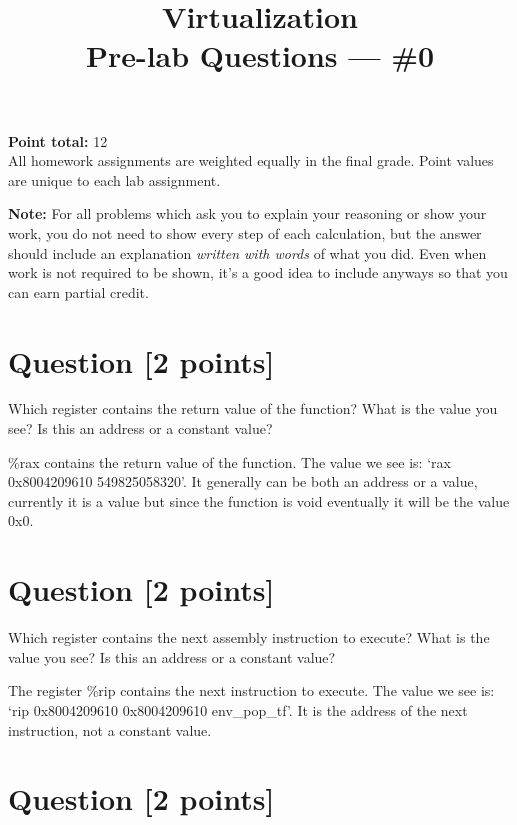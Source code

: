 \documentclass[11pt]{article}
\providecommand{\due}{}
\begin{document}
\title{Virtualization\\Pre-lab Questions --- \#0}
\date{\due}

\maketitle

\noindent \textbf{Point total:} 12
\\ All homework assignments are weighted equally in the final grade. 
Point values are unique to each lab assignment.

\textbf{Note:} For all problems which ask you to explain your reasoning or show your work, 
you do not need to show every step of each calculation, 
but the answer should include an explanation \emph{written with words} of what you did.  
Even when work is not required to be shown, it’s a good idea to include anyways so that 
you can earn partial credit.

\section{Question [2 points]}

Which register contains the return value of the function? 
What is the value you see? Is this an address or a constant value?

\begin{solution}
\%rax contains the return value of the function. The value we see is:
 `rax            0x8004209610     549825058320'.
 It generally can be both an address or a value, currently it is a value 
 but since the function is void eventually it will be the value 0x0. 
\end{solution}


\section{Question [2 points]}

Which register contains the next assembly instruction to execute? 
What is the value you see? Is this an address or a constant value?

\begin{solution}
The register \%rip contains the next instruction to execute. 
The value we see is: `rip            0x8004209610     0x8004209610 env\_pop\_tf'. 
It is the address of the next instruction, not a constant value. 
\end{solution}


\section{Question [2 points]}
\end{document}
